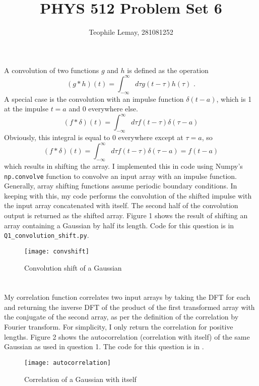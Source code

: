 \documentclass{article}
\title{PHYS 512 Problem Set 6}
\author{Teophile Lemay, 281081252}
\date{}
\newcommand{\<}[1]{\left\langle #1 \right\rangle }
\begin{document}
\maketitle

\section{}
A convolution of two functions $g$ and $h$ is defined as the operation
\[(g * h)(t) = \int_{-\infty}^{\infty}d\tau g(t-\tau)h(\tau) \text{ .}\]
A special case is the convolution with an impulse function $\delta(t-a)$, which is 1 at the impulse $t=a$ and 0 everywhere else.
\[(f*\delta)(t) = \int_{-\infty}^{\infty}d\tau f(t-\tau)\delta(\tau-a)\]
Obviously, this integral is equal to 0 everywhere except at $\tau= a$, so
\[(f*\delta)(t) = \int_{-\infty}^{\infty}d\tau f(t-\tau)\delta(\tau-a) = f(t-a)\]
which results in shifting the array. I implemented this in code using Numpy's \texttt{np.convolve} function to convolve an input array with an impulse function. Generally, array shifting functions assume periodic boundary conditions. In keeping with this, my code performs the convolution of the shifted impulse with the input array concatenated with itself. The second half of the convolution output is returned as the shifted array. Figure 1 shows the result of shifting an array containing a Gaussian by half its length. Code for this question is in \texttt{Q1\_convolution\_shift.py}.
\begin{figure}[h]
	\caption{Convolution shift of a Gaussian}
	\centering
	\texttt{[image: convshift]}
\end{figure}

\section{}
My correlation function correlates two input arrays by taking the DFT for each and returning the inverse DFT of the product of the first transformed array with the conjugate of the second array, as per the definition of the correlation by Fourier transform. For simplicity, I only return the correlation for positive lengths. Figure 2 shows the autocorrelation (correlation with itself) of the same Gaussian as used in question 1. The code for this question is in .
\begin{figure}[h]
	\caption{Correlation of a Gaussian with itself}
	\centering
	\texttt{[image: autocorrelation]}
\end{figure}
	
	
\end{document}
